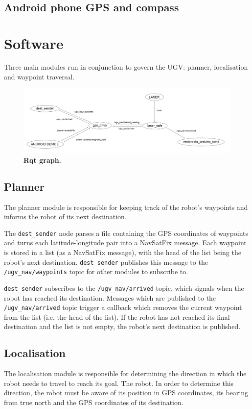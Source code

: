 \documentclass[titlepage,12pt,a4paper]{article}
\begin{document}
\subsection{Android phone GPS and compass}


\pagebreak
\section{Software}

Three main modules run in conjunction to govern the UGV: planner, localisation and waypoint traversal.

\begin{figure}[h]
	\centering
	\includegraphics[scale=0.255]{figures/rqt.png}
	\caption{\textbf{Rqt graph.}}
\end{figure}

\subsection{Planner}
The planner module is responsible for keeping track of the robot's waypoints and informs the robot of its next destination. 

The \verb|dest_sender| node parses a file containing the GPS coordinates of waypoints and turns each latitude-longitude pair into a NavSatFix message. Each waypoint is stored in a list (as a NavSatFix message), with the head of the list being the robot's next destination. \verb|dest_sender| publishes this message to the \verb|/ugv_nav/waypoints| topic for other modules to subscribe to.

\verb|dest_sender| subscribes to the \verb|/ugv_nav/arrived| topic, which signals when the robot has reached its destination. Messages which are published to the \verb|/ugv_nav/arrived| topic trigger a callback which removes the current waypoint from the list (i.e. the head of the list). If the robot has not reached its final destination and the list is not empty, the robot's next destination is published.

\pagebreak

\subsection{Localisation}
The localisation module is responsible for determining the direction in which the robot needs to travel to reach its goal. The robot. In order to determine this direction, the robot must be aware of its position in GPS coordinates, its bearing from true north and the GPS coordinates of its destination.
\end{document}
